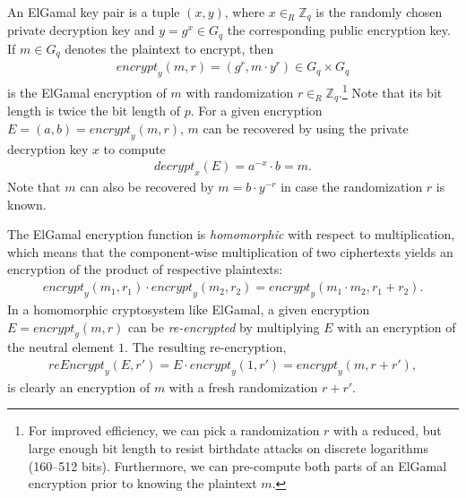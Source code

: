\documentclass[bibtotoc,halfparskip,oneside]{scrreprt}
\begin{document}
An ElGamal key pair is a tuple $(x,y)$, where $x\in_R\mathbb{Z}_q$ is the randomly chosen private decryption key and $y=g^x\in G_q$ the corresponding public encryption key. If $m\in G_q$ denotes the plaintext to encrypt, then 
\begin{align}
	\mathit{encrypt}_y(m,r)=(g^r,m\cdot y^r)\in G_q\times G_q
\end{align} 
is the ElGamal encryption of $m$ with randomization $r \in_R\mathbb{Z}_q$.\footnote{For improved efficiency, we can pick a randomization $r$ with a reduced, but large enough bit length to resist birthdate attacks on discrete logarithms (160--512 bits). Furthermore, we can pre-compute both parts of an ElGamal encryption prior to knowing the plaintext $m$.} Note that its bit length is twice the bit length of $p$. For a given encryption $E=(a,b)=\mathit{encrypt}_y(m,r)$, $m$ can be recovered by using the private decryption key $x$ to compute 
\begin{align}
	\mathit{decrypt}_x(E)=a^{-x}\cdot b = m.
\end{align} 
Note that $m$ can also be recovered by $m=b\cdot y^{-r}$ in case the randomization $r$ is known. 

The ElGamal encryption function is \emph{homomorphic} with respect to multiplication, which means that the component-wise multiplication of two ciphertexts yields an encryption of the product of respective plaintexts:
\begin{align}
	\mathit{encrypt}_y(m_1,r_1)\cdot\mathit{encrypt}_y(m_2,r_2)=\mathit{encrypt}_y(m_1\cdot m_2,r_1+r_2).
\end{align}
In a homomorphic cryptosystem like ElGamal, a given encryption $E=\mathit{encrypt}_y(m,r)$ can be \emph{re-encrypted} by multiplying $E$ with an encryption of the neutral element $1$. The resulting re-encryption, 
\begin{align}
	\mathit{reEncrypt}_y(E,r')=E\cdot\mathit{encrypt}_y(1,r')=\mathit{encrypt}_y(m,r+r'),
\end{align}
is clearly an encryption of $m$ with a fresh randomization $r+r'$.
\end{document}
